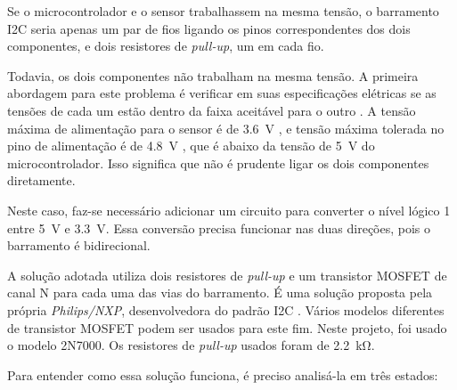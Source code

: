 \documentclass[brazil,pagestart=firstchapter]{abnt}
\begin{document}
Se o microcontrolador e o sensor trabalhassem na mesma tensão, o barramento
\ac{I2C} seria apenas um par de fios ligando os pinos correspondentes dos
dois componentes, e dois resistores de \textit{pull-up}, um em cada fio.

Todavia, os dois componentes não trabalham na mesma tensão. A primeira
abordagem para este problema é verificar em suas especificações elétricas se
as tensões de cada um estão dentro da faixa aceitável para o outro
\cite{AN97055}. A tensão máxima de alimentação para o sensor é de
\SI{3.6}{\volt} \cite{HMC5883L}, e tensão máxima tolerada no pino de
alimentação é de \SI{4.8}{\volt} \cite{HMC5883L}, que é abaixo da
tensão de \SI{5}{\volt} do microcontrolador. Isso significa que não é
prudente ligar os dois componentes diretamente.

Neste caso, faz-se necessário adicionar um circuito para converter o nível
lógico 1 entre \SI{5}{\volt} e \SI{3.3}{\volt}. Essa conversão precisa
funcionar nas duas direções, pois o barramento é bidirecional.

A solução adotada utiliza dois resistores de \textit{pull-up} e um
transistor MOSFET de canal N para cada uma das vias do barramento. É uma
solução proposta pela própria \textit{Philips/NXP}, desenvolvedora do padrão
\ac{I2C} \cite{AN97055} \cite{AN10441}. Vários modelos diferentes de
transistor MOSFET podem ser usados para este fim. Neste projeto, foi usado o
modelo 2N7000. Os resistores de \textit{pull-up} usados foram de
\SI{2.2}{\kilo\ohm}.

Para entender como essa solução funciona, é preciso analisá-la em três
estados: \cite{AN97055} \cite{AN10441}
\end{document}

